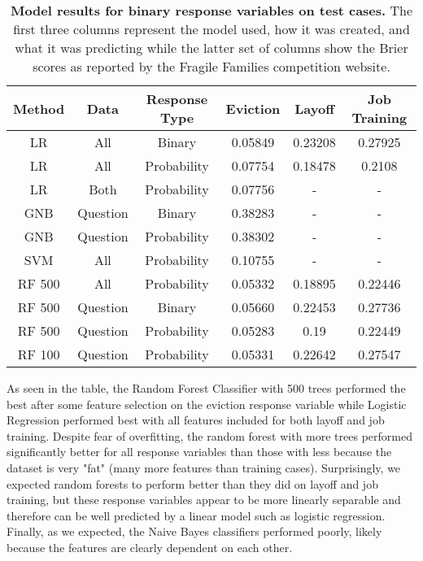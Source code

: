 \documentclass{article} %
\begin{document}
\begin{table}[ht]
\begin{center}
\begin{tabular}{|c|c|c||c|c|c|} 
\hline
\textbf{Method} & \textbf{Data} & \textbf{Response Type} & 
\textbf{Eviction} & \textbf{Layoff} & \textbf{Job Training} \\
\hline\hline
LR & All & Binary & 0.05849 & 0.23208 & 0.27925 \\
\hline
LR & All & Probability & 0.07754 & 0.18478 & 0.2108 \\
\hline
LR & Both & Probability & 0.07756 & - & - \\
\hline
GNB & Question & Binary & 0.38283 & - & - \\
\hline
GNB & Question & Probability & 0.38302 & - & - \\
\hline
SVM & All & Probability & 0.10755 & - & - \\
\hline
RF 500 & All & Probability & 0.05332 & 0.18895 & 0.22446 \\
\hline
RF 500 & Question & Binary & 0.05660 & 0.22453 & 0.27736 \\
\hline
RF 500 & Question & Probability & 0.05283 & 0.19 & 0.22449 \\
\hline
RF 100 & Question & Probability & 0.05331 & 0.22642 & 0.27547 \\
\hline
\end{tabular}
\caption{\label{tab:res}\textbf{Model results for binary response variables on test cases.} The first three columns represent the model used, how it was created, and what it was predicting while the latter set of columns show the Brier scores as reported by the Fragile Families competition website.}
\end{center}
\end{table}

As seen in the table, the Random Forest Classifier with 500 trees performed the best after some feature selection on the eviction response variable while Logistic Regression performed best with all features included for both layoff and job training. Despite fear of overfitting, the random forest with more trees performed significantly better for all response variables than those with less because the dataset is very "fat" (many more features than training cases). Surprisingly, we expected random forests to perform better than they did on layoff and job training, but these response variables appear to be more linearly separable and therefore can be well predicted by a linear model such as logistic regression. Finally, as we expected, the Naive Bayes classifiers performed poorly, likely because the features are clearly dependent on each other.
\end{document}
